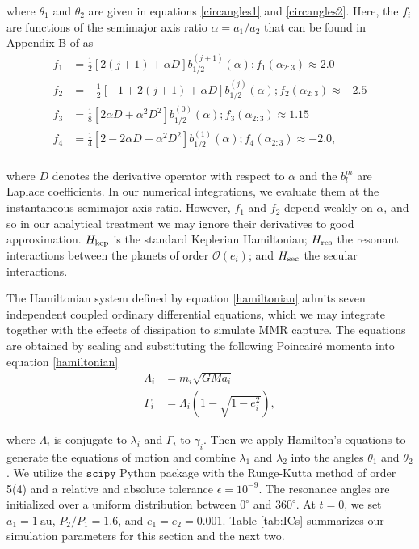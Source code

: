 \documentclass[usenatbib,onecolumn]{mnras}
\renewcommand{\O}{\mathcal{O}}
\begin{document}
\noindent
where \(\theta_1\) and \(\theta_2\) are given in equations
\eqref{circangles1} and \eqref{circangles2}.
Here, the \(f_i\) are functions of the semimajor
axis ratio \(\alpha=a_1/a_2\) that can be found in Appendix B of
\citet{murray_solar_2000} as
\begin{align}
\label{coefficients}
  f_1 &= \frac12[2(j+1)+\alpha D]b_{1/2}^{(j+1)}(\alpha); f_1(\alpha_{2:3})\approx 2.0 \\
  f_2 &= -\frac12[-1+2(j+1)+\alpha D]b_{1/2}^{(j)}(\alpha);f_2(\alpha_{2:3}) \approx -2.5\\
  f_3 &= \frac18[2\alpha D + \alpha^2 D^2]b_{1/2}^{(0)}(\alpha); f_3(\alpha_{2:3})\approx 1.15\\
  f_4 &= \frac14[2-2\alpha D - \alpha^2 D^2]b_{1/2}^{(1)}(\alpha); f_4(\alpha_{2:3})\approx -2.0, \\
\end{align}

\noindent where \(D\) denotes the derivative operator with
respect to \(\alpha\) and the \(b_{l}^m\) are Laplace coefficients.  In
our numerical integrations, we evaluate them at the instantaneous
semimajor axis ratio.  However, \(f_1\) and \(f_2\) depend weakly on
\(\alpha\), and so in our analytical treatment we may ignore their
derivatives to good approximation.  \(H_{\rm kep}\) is the standard
Keplerian Hamiltonian; \(H_{\rm res}\) the resonant interactions between
the planets of order \(\O(e_i)\); and \(H_{\rm sec}\) the secular
interactions.

The Hamiltonian system defined by equation \eqref{hamiltonian} admits
seven independent coupled ordinary differential equations, which we
may integrate together with the effects of dissipation to simulate MMR
capture.  The equations are obtained by scaling and substituting the
following Poincair\'e momenta into equation
\eqref{hamiltonian}
\begin{align}
  \Lambda_i &= m_i\sqrt{GMa_i}\\
  \Gamma_i &= \Lambda_i(1-\sqrt{1-e_i^2}),
\end{align}

\noindent where \(\Lambda_i\) is conjugate to \(\lambda_i\) and
\(\Gamma_i\) to \(\gamma_i\).  Then we apply Hamilton's equations to
generate the equations of motion and combine \(\lambda_1\) and
\(\lambda_2\) into the angles \(\theta_1\) and \(\theta_2\).  We utilize the
\(\mathtt{scipy}\) Python package with the Runge-Kutta method of order
5(4) and a relative and absolute tolerance \(\epsilon=10^{-9}\).  The
resonance angles are initialized over a uniform distribution between
\(0^\circ\) and \(360^\circ\).  At \(t=0\), we set \(a_1=1~\mathrm{au}\),
\(P_2/P_1=1.6\), and \(e_1=e_2=0.001\).  Table \ref{tab:ICs} summarizes our
simulation parameters for this section and the next two.
\end{document}
